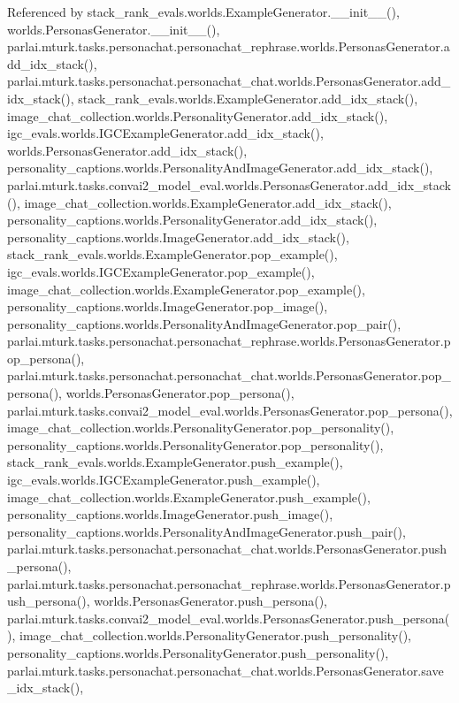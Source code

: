 Referenced by stack\+\_\+rank\+\_\+evals.\+worlds.\+Example\+Generator.\+\_\+\+\_\+init\+\_\+\+\_\+(), worlds.\+Personas\+Generator.\+\_\+\+\_\+init\+\_\+\+\_\+(), parlai.\+mturk.\+tasks.\+personachat.\+personachat\+\_\+rephrase.\+worlds.\+Personas\+Generator.\+add\+\_\+idx\+\_\+stack(), parlai.\+mturk.\+tasks.\+personachat.\+personachat\+\_\+chat.\+worlds.\+Personas\+Generator.\+add\+\_\+idx\+\_\+stack(), stack\+\_\+rank\+\_\+evals.\+worlds.\+Example\+Generator.\+add\+\_\+idx\+\_\+stack(), image\+\_\+chat\+\_\+collection.\+worlds.\+Personality\+Generator.\+add\+\_\+idx\+\_\+stack(), igc\+\_\+evals.\+worlds.\+I\+G\+C\+Example\+Generator.\+add\+\_\+idx\+\_\+stack(), worlds.\+Personas\+Generator.\+add\+\_\+idx\+\_\+stack(), personality\+\_\+captions.\+worlds.\+Personality\+And\+Image\+Generator.\+add\+\_\+idx\+\_\+stack(), parlai.\+mturk.\+tasks.\+convai2\+\_\+model\+\_\+eval.\+worlds.\+Personas\+Generator.\+add\+\_\+idx\+\_\+stack(), image\+\_\+chat\+\_\+collection.\+worlds.\+Example\+Generator.\+add\+\_\+idx\+\_\+stack(), personality\+\_\+captions.\+worlds.\+Personality\+Generator.\+add\+\_\+idx\+\_\+stack(), personality\+\_\+captions.\+worlds.\+Image\+Generator.\+add\+\_\+idx\+\_\+stack(), stack\+\_\+rank\+\_\+evals.\+worlds.\+Example\+Generator.\+pop\+\_\+example(), igc\+\_\+evals.\+worlds.\+I\+G\+C\+Example\+Generator.\+pop\+\_\+example(), image\+\_\+chat\+\_\+collection.\+worlds.\+Example\+Generator.\+pop\+\_\+example(), personality\+\_\+captions.\+worlds.\+Image\+Generator.\+pop\+\_\+image(), personality\+\_\+captions.\+worlds.\+Personality\+And\+Image\+Generator.\+pop\+\_\+pair(), parlai.\+mturk.\+tasks.\+personachat.\+personachat\+\_\+rephrase.\+worlds.\+Personas\+Generator.\+pop\+\_\+persona(), parlai.\+mturk.\+tasks.\+personachat.\+personachat\+\_\+chat.\+worlds.\+Personas\+Generator.\+pop\+\_\+persona(), worlds.\+Personas\+Generator.\+pop\+\_\+persona(), parlai.\+mturk.\+tasks.\+convai2\+\_\+model\+\_\+eval.\+worlds.\+Personas\+Generator.\+pop\+\_\+persona(), image\+\_\+chat\+\_\+collection.\+worlds.\+Personality\+Generator.\+pop\+\_\+personality(), personality\+\_\+captions.\+worlds.\+Personality\+Generator.\+pop\+\_\+personality(), stack\+\_\+rank\+\_\+evals.\+worlds.\+Example\+Generator.\+push\+\_\+example(), igc\+\_\+evals.\+worlds.\+I\+G\+C\+Example\+Generator.\+push\+\_\+example(), image\+\_\+chat\+\_\+collection.\+worlds.\+Example\+Generator.\+push\+\_\+example(), personality\+\_\+captions.\+worlds.\+Image\+Generator.\+push\+\_\+image(), personality\+\_\+captions.\+worlds.\+Personality\+And\+Image\+Generator.\+push\+\_\+pair(), parlai.\+mturk.\+tasks.\+personachat.\+personachat\+\_\+chat.\+worlds.\+Personas\+Generator.\+push\+\_\+persona(), parlai.\+mturk.\+tasks.\+personachat.\+personachat\+\_\+rephrase.\+worlds.\+Personas\+Generator.\+push\+\_\+persona(), worlds.\+Personas\+Generator.\+push\+\_\+persona(), parlai.\+mturk.\+tasks.\+convai2\+\_\+model\+\_\+eval.\+worlds.\+Personas\+Generator.\+push\+\_\+persona(), image\+\_\+chat\+\_\+collection.\+worlds.\+Personality\+Generator.\+push\+\_\+personality(), personality\+\_\+captions.\+worlds.\+Personality\+Generator.\+push\+\_\+personality(), parlai.\+mturk.\+tasks.\+personachat.\+personachat\+\_\+chat.\+worlds.\+Personas\+Generator.\+save\+\_\+idx\+\_\+stack(), 
